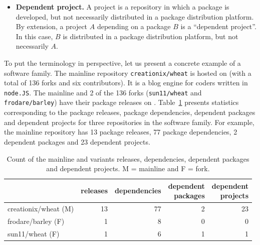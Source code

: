 \begin{itemize}
      \item \textbf{Dependent project.} A project is a repository in which a package is developed, but not necessarily distributed in a package distribution platform. By extension, a project $A$ depending on a package $B$ is a ``dependent project''. In this case, $B$ is distributed in a package distribution platform, but not necessarily $A$.
    
   

\end{itemize}

To put the terminology in perspective, let us present a concrete example of a software family. 
The mainline repository \texttt{creationix/wheat} is hosted on \gh (with a total of 136 forks and six contributors). It is a blog engine for coders written in \texttt{node.JS}. 
The mainline and 2 of the 136 forks (\texttt{sun11/wheat} and \texttt{frodare/barley}) have their package releases on \npm.
Table~\ref{tab:example} presents statistics corresponding to the package releases, package dependencies, dependent packages and dependent projects for three repositories in the software family.
For example, the mainline repository has 13 package releases, 77 package dependencies, 2 dependent packages and 23 dependent projects.

\begin{table}[ht]
\begin{center}
\caption{Count of the mainline and variants releases, dependencies, dependent packages and dependent projects. M = mainline and F = fork.}
\label{tab:example}
\begin{tabular}{l r r r r } 
 \hline
 &releases & dependencies & \shortstack{dependent \\ packages} & \shortstack{dependent \\ projects} \\ \hline
 creationix/wheat (M)  &13 & 77 & 2&23 \\ 
 frodare/barley (F)    &1 & 8 & 0 & 0 \\ 
 sun11/wheat (F)       &1 & 6 & 1 & 1 \\ 
 \hline
\end{tabular}
\end{center}
\end{table}

